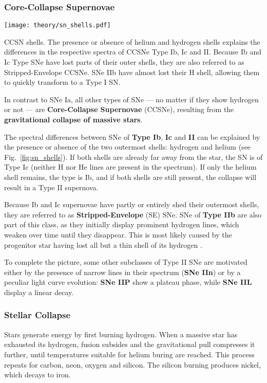 \subsubsection{Core-Collapse Supernovae}\label{ccsne}

\begin{marginfigure}
    \texttt{[image: theory/sn\_shells.pdf]}
    \caption[CCSN shells]{CCSN shells. The presence or absence of helium and hydrogen shells explains the differences in the respective spectra of CCSNe Type Ib, Ic and II. Because Ib and Ic Type SNe have lost parts of their outer shells, they are also referred to as Stripped-Envelope CCSNe. SNe IIb have almost lost their H shell, allowing them to quickly transform to a Type I SN.}
\end{marginfigure}

In contrast to SNe Ia, all other types of SNe --- no matter if they show hydrogen or not --- are \textbf{Core-Collapse Supernovae} (CCSNe), resulting from the \textbf{gravitational collapse of massive stars}.

The spectral differences between SNe of \textbf{Type Ib}, \textbf{Ic} and \textbf{II} can be explained by the presence or absence of the two outermost shells: hydrogen and helium (see Fig.~\ref{fig:sn_shells}). If both shells are already far away from the star, the SN is of Type Ic (neither H nor He lines are present in the spectrum). If only the helium shell remains, the type is Ib, and if both shells are still present, the collapse will result in a Type II supernova.

Because Ib and Ic supernovae have partly or entirely shed their outermost shells, they are referred to as \textbf{Stripped-Envelope} (SE) SNe. SNe of \textbf{Type IIb} are also part of this class, as they initially display prominent hydrogen lines, which weaken over time until they disappear. This is most likely caused by the progenitor star having lost all but a thin shell of its hydrogen .

To complete the picture, some other subclasses of Type II SNe are motivated either by the presence of narrow lines in their spectrum (\textbf{SNe IIn}) or by a peculiar light curve evolution: \textbf{SNe IIP} show a plateau phase, while \textbf{SNe IIL} display a linear decay.

\subsubsection{Stellar Collapse}
Stars generate energy by first burning hydrogen. When a massive star has exhausted its hydrogen, fusion subsides and the gravitational pull compresses it further, until temperatures suitable for helium buring are reached. This process repeats for carbon, neon, oxygen and silicon. The silicon burning produces nickel, which decays to iron.

